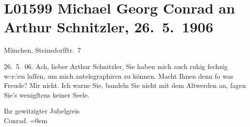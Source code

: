 

\section[Michael Georg Conrad an Arthur Schnitzler, 26. 5. 1906]{L01599 Michael Georg Conrad an Arthur Schnitzler, 26. 5. 1906}
\nopagebreak{}
\rehead{ }\normalsize\beginnumbering{}
\toendnotes[C]{\smallbreak\pagebreak[2]}
\toendnotes[C]{\smallbreak}
\pstart
           {\pb}München, Steinsdorfſtr. 7\pend
           
\pstart
           \raggedleft{}26. 5. 06.\pend
           \vspace{0.5em}
\pstart
           Ach, lieber Arthur Schnitzler, Sie haben mich auch ruhig{ }ſechzig
               w\textcolor{gray}{e}r\textcolor{gray}{d}en laſſen, um mich antelegraphiren zu können. Macht Ihnen denn{ }ſo was Freude? Mir
               nicht. Ich warne Sie, bandeln Sie nicht mit dem Altwerden an,{ }ſagen Sie’s wenigſtens
               keiner Seele.\pend
           
\pstart
           Ihr gewitzigter Jubelgreis{\\[\baselineskip]}\spacefill\mbox{Conrad.}\pend
           \leftskip=0em{}\endnumbering{}  \newcommand{\dateiname}{L01599}\newcommand{\titel}{Michael Georg Conrad an Arthur Schnitzler, 26. 5. 1906}\newcommand{\editorInnen}{Martin Anton Müller und Gerd-Hermann Susen}
